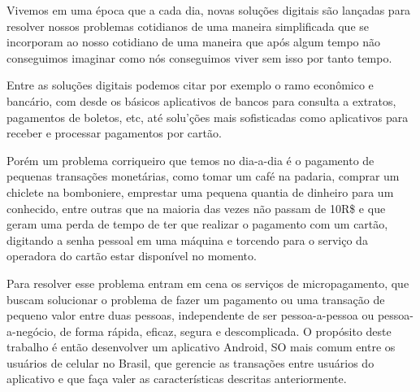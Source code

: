 \documentclass[hidelinks,12pt]{article}
\begin{document}
Vivemos em uma \'epoca que a cada dia, novas solu\c{c}\~oes digitais s\~ao lan\c{c}adas para resolver nossos problemas cotidianos de uma maneira simplificada que se incorporam ao nosso cotidiano de uma maneira que ap\'os algum tempo n\~ao conseguimos imaginar como n\'os conseguimos viver sem isso por tanto tempo.

Entre as solu\c{c}\~oes digitais podemos citar por exemplo o ramo econ\^omico e banc\'ario, com desde os b\'asicos aplicativos de bancos para consulta a extratos, pagamentos de boletos, etc, at\'e solu'\c{c}\~oes mais sofisticadas como aplicativos para receber e processar pagamentos por cart\~ao.

Por\'em um problema corriqueiro que temos no dia-a-dia \'e o pagamento de pequenas transa\c{c}\~oes monet\'arias, como tomar um caf\'e na padaria, comprar um chiclete na bomboniere, emprestar uma pequena quantia de dinheiro para um conhecido, entre outras que na maioria das vezes n\~ao passam de 10R\$ e que geram uma perda de tempo de ter que realizar o pagamento com um cart\~ao, digitando a senha pessoal em uma m\'aquina e torcendo para o servi\c{c}o da operadora do cart\~ao estar disponível no momento.

Para resolver esse problema entram em cena os servi\c{c}os de micropagamento, que buscam solucionar o problema de fazer um pagamento ou uma transa\c{c}\~ao de pequeno valor entre duas pessoas, independente de ser pessoa-a-pessoa ou pessoa-a-neg\'ocio, de forma r\'apida, eficaz, segura e descomplicada. O prop\'osito deste trabalho \'e ent\~ao desenvolver um aplicativo Android, SO mais comum entre os usu\'arios de celular no Brasil, que gerencie as transações entre usu\'arios do aplicativo e que fa\c{c}a valer as caracter\'isticas descritas anteriormente.
\newline
\end{document}
